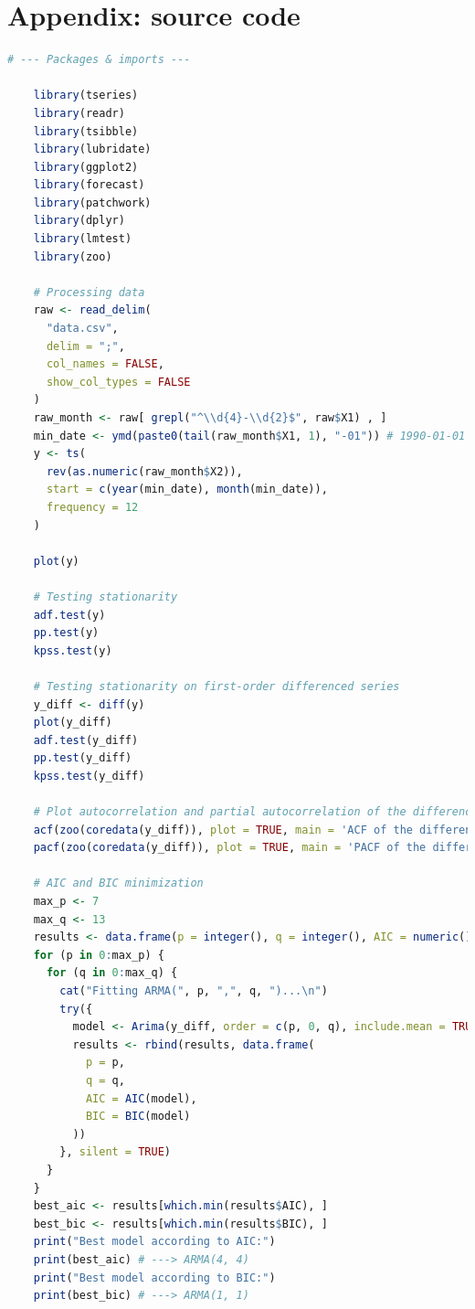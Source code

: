 \documentclass[12pt]{article}
\begin{document}
    \section{Appendix: source code}

    \begin{lstlisting}[language=R]
    # --- Packages & imports ---

    library(tseries)
    library(readr)
    library(tsibble)
    library(lubridate)
    library(ggplot2)
    library(forecast)
    library(patchwork)
    library(dplyr)
    library(lmtest)
    library(zoo)
    
    # Processing data
    raw <- read_delim(
      "data.csv",
      delim = ";",
      col_names = FALSE,
      show_col_types = FALSE
    )
    raw_month <- raw[ grepl("^\\d{4}-\\d{2}$", raw$X1) , ]
    min_date <- ymd(paste0(tail(raw_month$X1, 1), "-01")) # 1990-01-01
    y <- ts(
      rev(as.numeric(raw_month$X2)),
      start = c(year(min_date), month(min_date)),
      frequency = 12
    )
    
    plot(y)
    
    # Testing stationarity
    adf.test(y)
    pp.test(y)
    kpss.test(y)
    
    # Testing stationarity on first-order differenced series
    y_diff <- diff(y)
    plot(y_diff)
    adf.test(y_diff)
    pp.test(y_diff)
    kpss.test(y_diff)
    
    # Plot autocorrelation and partial autocorrelation of the differenced series
    acf(zoo(coredata(y_diff)), plot = TRUE, main = 'ACF of the differenced series')
    pacf(zoo(coredata(y_diff)), plot = TRUE, main = 'PACF of the differenced series')
    
    # AIC and BIC minimization
    max_p <- 7
    max_q <- 13
    results <- data.frame(p = integer(), q = integer(), AIC = numeric(), BIC = numeric())
    for (p in 0:max_p) {
      for (q in 0:max_q) {
        cat("Fitting ARMA(", p, ",", q, ")...\n")
        try({
          model <- Arima(y_diff, order = c(p, 0, q), include.mean = TRUE)
          results <- rbind(results, data.frame(
            p = p,
            q = q,
            AIC = AIC(model),
            BIC = BIC(model)
          ))
        }, silent = TRUE)
      }
    }
    best_aic <- results[which.min(results$AIC), ]
    best_bic <- results[which.min(results$BIC), ]
    print("Best model according to AIC:")
    print(best_aic) # ---> ARMA(4, 4)
    print("Best model according to BIC:")
    print(best_bic) # ---> ARMA(1, 1)
    

\end{lstlisting}
\end{document}
